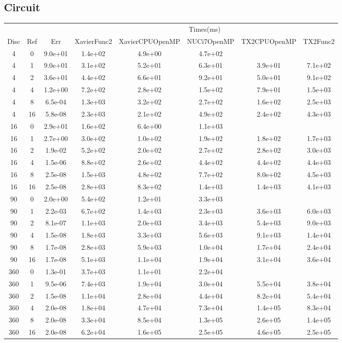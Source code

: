 \begin{landscape}
\subsection{Circuit}
\begin{center}
\begin{tabular}{c|c|c|c|c|c|c|c}
	&&&\multicolumn{5}{c}{Times(ms)}\\
	Disc&Ref&Err&XavierFunc2&XavierCPUOpenMP&NUCi7OpenMP&TX2CPUOpenMP&TX2Func2\\
\hline
4&0&9.0e+01&1.4e+02&4.9e+00&4.7e+02\\
4&1&9.0e+01&3.1e+02&5.2e+01&6.3e+01&3.9e+01&7.1e+02\\
4&2&3.6e+01&4.4e+02&6.6e+01&9.2e+01&5.0e+01&9.1e+02\\
4&4&1.2e+00&7.2e+02&2.8e+02&1.5e+02&7.9e+01&1.5e+03\\
4&8&6.5e-04&1.3e+03&3.2e+02&2.7e+02&1.6e+02&2.5e+03\\
4&16&5.8e-08&2.3e+03&2.1e+02&4.9e+02&2.4e+02&4.3e+03\\
\hline
16&0&2.9e+01&1.6e+02&6.4e+00&1.1e+03\\
16&1&2.7e+00&3.0e+02&1.0e+02&1.9e+02&1.8e+02&1.7e+03\\
16&2&1.9e-02&5.2e+02&2.0e+02&2.7e+02&2.8e+02&3.0e+03\\
16&4&1.5e-06&8.8e+02&2.6e+02&4.4e+02&4.4e+02&4.4e+03\\
16&8&2.5e-08&1.5e+03&4.8e+02&7.7e+02&8.0e+02&4.5e+03\\
16&16&2.5e-08&2.8e+03&8.3e+02&1.4e+03&1.4e+03&4.1e+03\\
\hline
90&0&2.0e+00&5.4e+02&1.2e+01&3.3e+03\\
90&1&2.2e-03&6.7e+02&1.4e+03&2.3e+03&3.6e+03&6.0e+03\\
90&2&8.1e-07&1.1e+03&2.0e+03&3.4e+03&5.4e+03&9.0e+03\\
90&4&1.5e-08&1.8e+03&3.3e+03&5.6e+03&9.1e+03&1.4e+04\\
90&8&1.7e-08&2.8e+03&5.9e+03&1.0e+04&1.7e+04&2.4e+04\\
90&16&1.7e-08&5.1e+03&1.1e+04&1.9e+04&3.1e+04&3.6e+04\\
\hline
360&0&1.3e-01&3.7e+03&1.1e+01&2.2e+04\\
360&1&9.5e-06&7.4e+03&1.9e+04&3.0e+04&5.5e+04&3.8e+04\\
360&2&1.5e-08&1.1e+04&2.8e+04&4.4e+04&8.2e+04&5.4e+04\\
360&4&2.0e-08&1.8e+04&4.7e+04&7.3e+04&1.4e+05&8.3e+04\\
360&8&2.0e-08&3.3e+04&8.5e+04&1.3e+05&2.6e+05&1.4e+05\\
360&16&2.0e-08&6.2e+04&1.6e+05&2.5e+05&4.6e+05&2.5e+05\\
\hline
\end{tabular}
\end{center}
\end{landscape}






